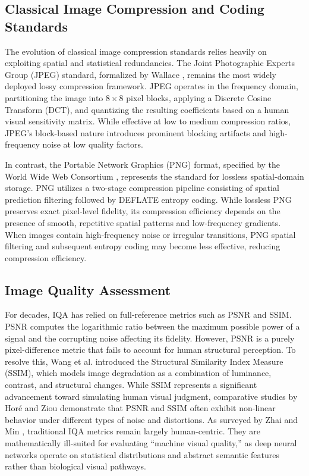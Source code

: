\documentclass[12pt, a4paper]{article}
\begin{document}
\subsection{Classical Image Compression and Coding Standards}
The evolution of classical image compression standards relies heavily on exploiting spatial and statistical redundancies. The Joint Photographic Experts Group (JPEG) standard, formalized by Wallace \cite{wallace1992}, remains the most widely deployed lossy compression framework. JPEG operates in the frequency domain, partitioning the image into $8\times8$ pixel blocks, applying a Discrete Cosine Transform (DCT), and quantizing the resulting coefficients based on a human visual sensitivity matrix. While effective at low to medium compression ratios, JPEG's block-based nature introduces prominent blocking artifacts and high-frequency noise at low quality factors.

In contrast, the Portable Network Graphics (PNG) format, specified by the World Wide Web Consortium \cite{w3c2003}, represents the standard for lossless spatial-domain storage. PNG utilizes a two-stage compression pipeline consisting of spatial prediction filtering followed by DEFLATE entropy coding. While lossless PNG preserves exact pixel-level fidelity, its compression efficiency depends on the presence of smooth, repetitive spatial patterns and low-frequency gradients. When images contain high-frequency noise or irregular transitions, PNG spatial filtering and subsequent entropy coding may become less effective, reducing compression efficiency.

\subsection{Image Quality Assessment}
For decades, IQA has relied on full-reference metrics such as PSNR and SSIM. PSNR computes the logarithmic ratio between the maximum possible power of a signal and the corrupting noise affecting its fidelity. However, PSNR is a purely pixel-difference metric that fails to account for human structural perception. To resolve this, Wang et al. \cite{wang2004} introduced the Structural Similarity Index Measure (SSIM), which models image degradation as a combination of luminance, contrast, and structural changes. While SSIM represents a significant advancement toward simulating human visual judgment, comparative studies by Horé and Ziou \cite{hore2010} demonstrate that PSNR and SSIM often exhibit non-linear behavior under different types of noise and distortions. As surveyed by Zhai and Min \cite{zhai2020}, traditional IQA metrics remain largely human-centric. They are mathematically ill-suited for evaluating ``machine visual quality,'' as deep neural networks operate on statistical distributions and abstract semantic features rather than biological visual pathways.
\end{document}
